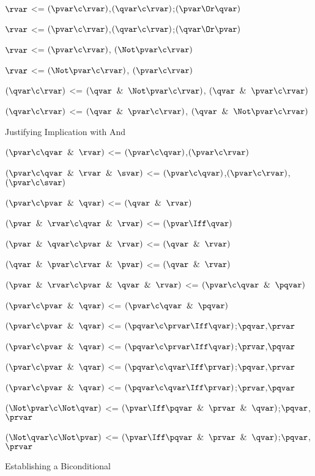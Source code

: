 $\rvar$ <= $(\pvar\c\rvar)$,$(\qvar \c \rvar)$;$(\pvar\Or\qvar)$
 
$\rvar$ <= $(\pvar\c\rvar)$,$(\qvar \c \rvar)$;$(\qvar\Or\pvar)$ 

$\rvar$ <= $(\pvar \c \rvar)$, $(\Not \pvar \c \rvar)$

$\rvar$ <= $(\Not\pvar \c \rvar)$, $(\pvar \c \rvar)$

$(\qvar \c \rvar)$ <= $(\qvar \And \Not\pvar \c \rvar)$, $(\qvar \And \pvar \c \rvar)$

$(\qvar \c \rvar)$ <= $(\qvar \And \pvar \c \rvar)$, $(\qvar \And \Not\pvar \c \rvar)$


\lineb



Justifying Implication with And
\lineb

$(\pvar \c \qvar \And \rvar)$ <= $(\pvar \c \qvar)$,$(\pvar \c \rvar)$

$(\pvar \c \qvar \And \rvar \And \svar)$ <= $(\pvar \c \qvar)$,$(\pvar \c \rvar)$,$(\pvar \c \svar)$

$(\pvar \c \pvar \And \qvar)$ <= $(\qvar \And \rvar)$

$(\pvar \And \rvar \c \qvar \And \rvar)$ <= $(\pvar \Iff \qvar)$

$(\pvar \And \qvar \c \pvar \And \rvar)$ <= $(\qvar \And \rvar)$

$(\qvar \And \pvar \c \rvar \And \pvar)$ <= $(\qvar \And \rvar)$

$(\pvar \And \rvar \c \pvar \And \qvar \And \rvar)$ <= $(\pvar \c \qvar \And \pqvar)$

$(\pvar  \c \pvar \And \qvar )$ <= $(\pvar \c \qvar \And \pqvar)$

$(\pvar  \c \pvar \And \qvar )$ <= $(\pqvar\c \prvar \Iff \qvar )$;$\pqvar$,$\prvar$

$(\pvar  \c \pvar \And \qvar )$ <= $(\pqvar\c \prvar \Iff \qvar )$;$\prvar$,$\pqvar$

$(\pvar  \c \pvar \And \qvar )$ <= $(\pqvar\c \qvar \Iff \prvar )$;$\pqvar$,$\prvar$

$(\pvar  \c \pvar \And \qvar )$ <= $(\pqvar\c \qvar \Iff \prvar )$;$\prvar$,$\pqvar$

$(\Not \pvar \c \Not \qvar)$ <= $(\pvar \Iff \pqvar \And \prvar \And \qvar)$;$\pqvar$,$\prvar$

$(\Not \qvar \c \Not \pvar)$ <= $(\pvar \Iff \pqvar \And \prvar \And \qvar)$;$\pqvar$,$\prvar$

\lineb

Establishing a Biconditional
\lineb

